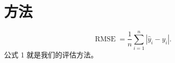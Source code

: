 \section{方法}
\begin{equation}\operatorname{RMSE}=\frac1n\sum_{i=1}^{n}|\hat y_i-y_i|.\end{equation}
公式 1 就是我们的评估方法。
